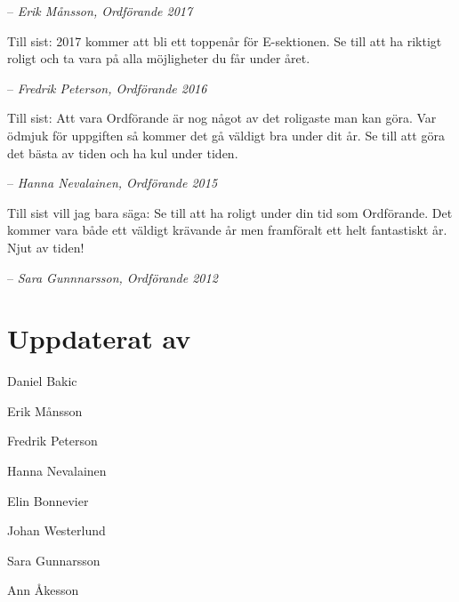 \documentclass[10pt]{article}
\begin{document}
    -- \emph{Erik Månsson, Ordförande 2017}
    
    \vspace*{1ex}
    
    Till sist: 2017 kommer att bli ett toppenår för E-sektionen. Se till att ha riktigt roligt och ta vara på alla möjligheter du får under året.
    
    -- \emph{Fredrik Peterson, Ordförande 2016}
    
    \vspace*{1ex}
    
    Till sist: Att vara Ordförande är nog något av det roligaste man kan göra. Var ödmjuk för uppgiften så kommer det gå väldigt bra under dit år. Se till att göra det bästa av tiden och ha kul under tiden.
    
    -- \emph{Hanna Nevalainen, Ordförande 2015}
    
    \vspace*{1ex}
    
    Till sist vill jag bara säga: Se till att ha roligt under din tid som Ordförande. Det kommer vara både ett väldigt krävande år men framföralt ett helt fantastiskt år. Njut av tiden!
    
    -- \emph{Sara Gunnnarsson, Ordförande 2012}
    
    \newpage
    
    \section{Uppdaterat av}
    
    \begin{description}[noitemsep, itemsep=1mm]
        \item[2018] Daniel Bakic
        \item[2017] Erik Månsson
        \item[2016] Fredrik Peterson
        \item[2015] Hanna Nevalainen
        \item[2014] Elin Bonnevier
        \item[2013] Johan Westerlund
        \item[2012] Sara Gunnarsson
        \item[2005] Ann Åkesson
    \end{description}
    
    
\end{document}
